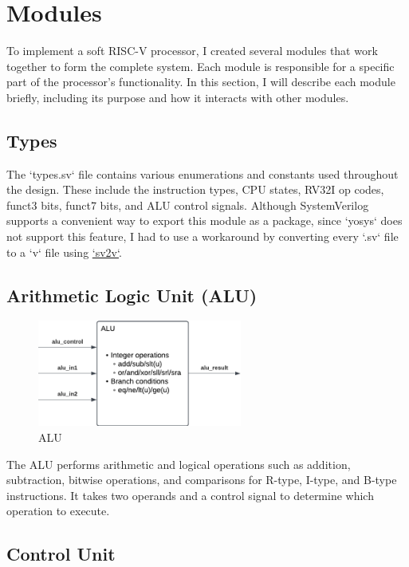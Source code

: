 \section{Modules}

To implement a soft RISC-V processor, I created several modules that work together to form the complete system.
Each module is responsible for a specific part of the processor's functionality.
In this section, I will describe each module briefly, including its purpose and how it interacts with other modules.

\subsection{Types}

The `types.sv` file contains various enumerations and constants used throughout the design.
These include the instruction types, CPU states, RV32I op codes, funct3 bits, funct7 bits, and ALU control signals.
Although SystemVerilog supports a convenient way to export this module as a package, since `yosys` does not support this feature, I had to use a workaround by converting every `.sv` file to a `v` file using
\href{https://github.com/zachjs/sv2v}{`sv2v`}.


\subsection{Arithmetic Logic Unit (ALU)}

\begin{figure}[H]
    \centering
    \includegraphics[width=0.6\textwidth]{media/alu}
    \caption{ALU}
    \label{fig:alu}
\end{figure}

The ALU performs arithmetic and logical operations such as addition, subtraction, bitwise operations, and comparisons for R-type, I-type, and B-type instructions.
It takes two operands and a control signal to determine which operation to execute.

\subsection{Control Unit}

